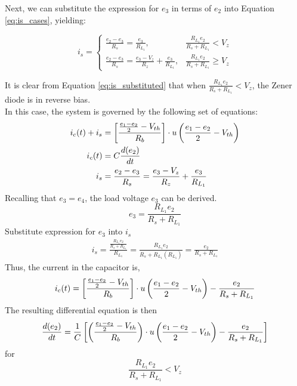 Next, we can substitute the expression for $e_3$ in terms of $e_2$ into Equation \ref{eq:is_cases}, yielding:

\begin{equation}
    i_s=\begin{cases}
        \frac{e_2-e_3}{R_s}=\frac{e_3}{R_{L_1}}, & \frac{R_{L_1}e_2}{R_s+R_{L_1}}<V_z\\
        \frac{e_2-e_3}{R_s}=\frac{e_3-V_z}{R_z}+\frac{e_3}{R_{L_1}}, & \frac{R_{L_1}e_2}{R_s+R_{L_1}} \geq V_z
    \end{cases}
    \label{eq:is_substituted}
\end{equation}

It is clear from Equation \ref{eq:is_substituted} that when $\frac{R_{L_1}e_2}{R_s+R_{L_1}}<V_z$, the Zener diode is in reverse bias.\\

In this case, the system is governed by the following set of equations:
\begin{equation}
	\begin{split}
    	i_c(t) + i_s &= \left[\frac{\frac{e_1 - e_2}{2} - V_{th}}{R_b} \right]\cdot u\left(\frac{e_1 - e_2}{2} - V_{th} \right)\\
    	i_c(t)&=C\frac{d(e_2)}{dt}\\
    	i_s&=\frac{e_2-e_3}{R_s}=\frac{e_3-V_z}{R_z}+\frac{e_3}{R_{L_1}}
	\end{split}
	    \label{eq:system_cutoff}
\end{equation}
Recalling that $e_3 = e_4$, the load voltage $e_3$ can be derived. 
\begin{equation}
	e_3 = \frac{R_{L_1} e_2}{R_s + R_{L_1}}
\end{equation}
Substitute expression for $e_3$ into $i_s$
\begin{equation}
	\begin{split}
		i_s = \frac{\frac{R_{L_1} e_2}{R_s + R_{L_1}}}{R_{L_1}} = \frac{R_{L_1}e_2}{R_s+R_{L_1}(R_{L_1})}
		    = \frac{e_2}{R_s + R_{L_1}}
	\end{split}
\end{equation}
Thus, the current in the capacitor is,
\begin{equation}
	i_c(t) = \left[\frac{\frac{e_1 - e_2}{2} - V_{th}}{R_b} \right]\cdot u\left(\frac{e_1 - e_2}{2} - V_{th} \right) - \frac{e_2}{R_s + R_{L_1}}
\end{equation}
The resulting differential equation is then
\begin{equation}
	\frac{d(e_2)}{dt} = \frac{1}{C} \left[ \left(\frac{\frac{e_1 - e_2}{2} - V_{th}}{R_b} \right)\cdot u\left(\frac{e_1 - e_2}{2} - V_{th} \right) - \frac{e_2}{R_s + R_{L_1}}  \right]
\end{equation}
for $$\frac{R_{L_1}e_2}{R_s+R_{L_1}} < V_z$$

